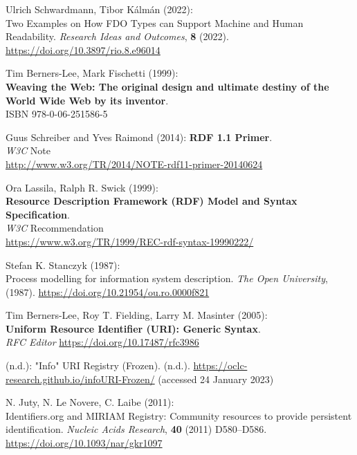\begin{thebibliography}{9}
Ulrich Schwardmann, Tibor Kálmán (2022): \\
Two {Examples} on {How FDO
Types} can {Support Machine} and {Human Readability}. \emph{Research
Ideas and Outcomes}, \textbf{8} (2022).
\url{https://doi.org/10.3897/rio.8.e96014}

Tim Berners-Lee, Mark Fischetti (1999): \\
\textbf{Weaving the {Web}: The original design and ultimate destiny of the {World Wide Web} by its
inventor}.\\
ISBN 978-0-06-251586-5

Guus Schreiber and Yves Raimond (2014):
\textbf{RDF 1.1 Primer}. \\
\emph{W3C} Note \\
\url{http://www.w3.org/TR/2014/NOTE-rdf11-primer-20140624}

Ora Lassila, Ralph R. Swick (1999): \\
\textbf{Resource {Description Framework} ({RDF}) {Model} and {Syntax Specification}}. \\
\emph{W3C} Recommendation\\
\url{https://www.w3.org/TR/1999/REC-rdf-syntax-19990222/}  

Stefan K. Stanczyk (1987): \\
Process modelling for information system
description. \emph{The Open University}, (1987).
\url{https://doi.org/10.21954/ou.ro.0000f821}

Tim Berners-Lee, Roy T. Fielding, Larry M. Masinter (2005): \\
\textbf{Uniform {Resource Identifier} ({URI}): {Generic Syntax}}.\\
\emph{RFC Editor}
\url{https://doi.org/10.17487/rfc3986}

(n.d.): "Info" {URI Registry} ({Frozen}). (n.d.).
\url{https://oclc-research.github.io/infoURI-Frozen/} (accessed 24
January 2023)

N. Juty, N. Le Novere, C. Laibe (2011): \\
Identifiers.org and {MIRIAM
Registry}: Community resources to provide persistent identification.
\emph{Nucleic Acids Research}, \textbf{40} (2011) D580--D586.
\url{https://doi.org/10.1093/nar/gkr1097}


\end{thebibliography}
